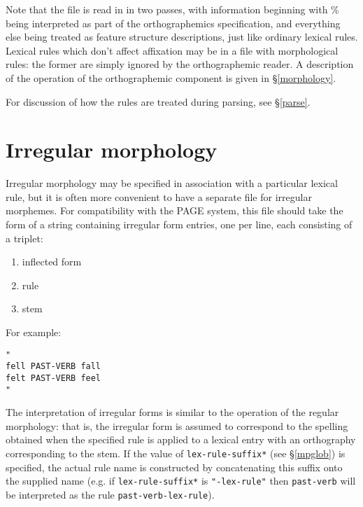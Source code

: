 \documentclass[12pt]{report}
\newcommand{\lkbentryname}[1]{{\tt #1}}
\newcommand{\lkbparam}[1]{{\tt #1}}
\begin{document}
Note that the file is read in in two passes, with information beginning
with \% being interpreted as part of the orthographemics specification,
and everything else being treated as feature structure descriptions,
just like ordinary lexical rules.
Lexical rules which don't affect affixation may be in a file
with morphological rules: the
former are simply ignored by the orthographemic
reader.
A description of the operation of the orthographemic component is
given in \S\ref{morphology}.

For discussion of how the rules are treated during parsing, see 
\S\ref{parse}.

\section{Irregular morphology}
\label{irregs}

Irregular morphology may be specified in association with a
particular lexical rule, but it is often more convenient
to have a separate file for irregular morphemes.  For compatibility
with the PAGE system, this file should take the form of a string
containing irregular form entries, one per line, each consisting of
a triplet: 
\begin{enumerate}
\item inflected form 
\item rule
\item stem
\end{enumerate}
For example:
\begin{verbatim}
"
fell PAST-VERB fall
felt PAST-VERB feel
"
\end{verbatim}
The interpretation of irregular forms is similar to the operation of the
regular morphology: that is, the irregular form is
assumed to correspond to the spelling obtained when the specified
rule is applied to a lexical entry with an orthography
corresponding to the stem.
If the value of 
\lkbparam{*lex-rule-suffix*} (see \S\ref{mpglob}) is specified,
the actual rule name is constructed by concatenating this suffix
onto the supplied name (e.g. if \lkbparam{*lex-rule-suffix*} 
is {\tt "-lex-rule"}
then {\tt past-verb} will be interpreted as 
the rule \lkbentryname{past-verb-lex-rule}).
\end{document}
